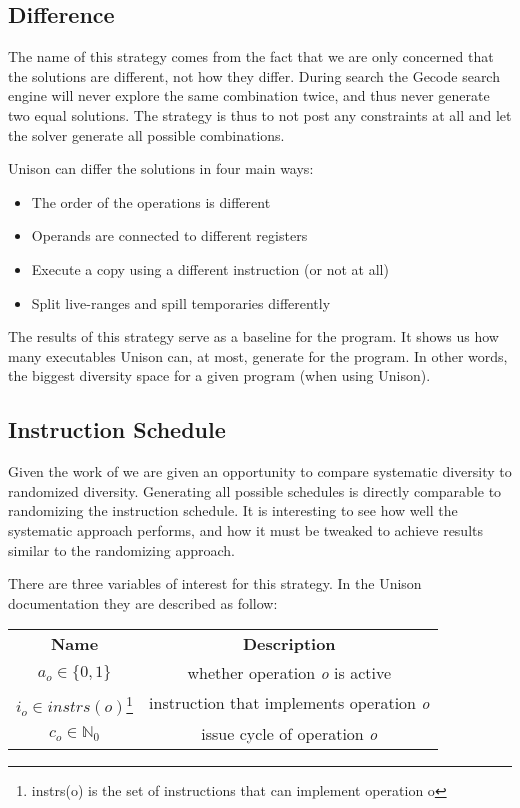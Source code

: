 \subsection{Difference}

The name of this strategy comes from the fact that we are only concerned that the solutions
are different, not how they differ. During search the Gecode search engine will never
explore the same combination twice, and thus never generate two equal solutions. The
strategy is thus to not post any constraints at all and let the solver generate all
possible combinations.

Unison can differ the solutions in four main ways:

\begin{itemize}
	\item The order of the operations is different
	\item Operands are connected to different registers
	\item Execute a copy using a different instruction (or not at all)
	\item Split live-ranges and spill temporaries differently
\end{itemize}

The results of this strategy serve as a baseline for the program. It shows us how many
executables Unison can, at most, generate for the program. In other words, the biggest
diversity space for a given program (when using Unison).

\subsection{Instruction Schedule}

Given the work of \textcite{large-scale-automated} we are given an opportunity to compare
systematic diversity to randomized diversity. Generating all possible schedules is directly
comparable to randomizing the instruction schedule. It is interesting to see how well
the systematic approach performs, and how it must be tweaked to achieve results similar
to the randomizing approach.

There are three variables of interest for this strategy. In the Unison documentation
they are described as follow:

\vspace{0.2cm}

\begin{tabular}{cc}
	\textbf{Name} & \textbf{Description} \\
	$a_o \in \{0, 1\}$ & whether operation \textit{o} is active \\
	$i_o \in instrs(o)$\footnote{instrs(o) is the set of instructions that can implement operation o} & instruction that implements operation \textit{o}  \\
	$c_o \in \mathbb{N}_0$ & issue cycle of operation \textit{o} \\
\end{tabular}

